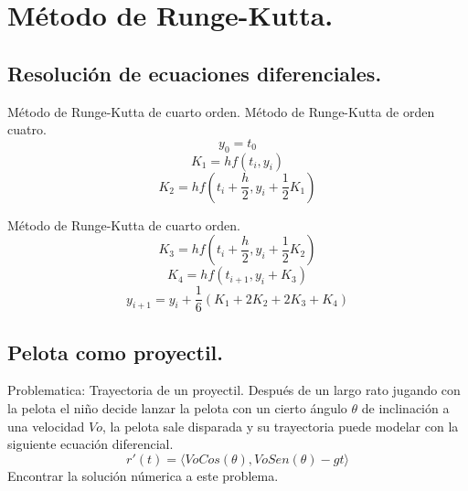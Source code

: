 \documentclass[12pt]{beamer}
\begin{document}
\section{Método de Runge-Kutta.}
\subsection{Resolución de ecuaciones diferenciales.}
\begin{frame}{Método de Runge-Kutta de cuarto orden.}
Método de Runge-Kutta de orden cuatro.
$$ y_{0} = t_{0} $$
$$ K_{1} = hf(t_{i}, y_{i})$$
$$ K_{2} = hf(t_{i} + \frac{h}{2}, y_{i} + \frac{1}{2} K_{1})$$
\end{frame}
\begin{frame}{Método de Runge-Kutta de cuarto orden.}
$$ K_{3} = hf(t_{i} + \frac{h}{2}, y_{i} + \frac{1}{2} K_{2})$$
$$ K_{4} = hf(t_{i+1}, y_{i} + K_{3})$$
$$ y_{i+1} = y_{i} + \frac{1}{6}(K_{1} + 2K_{2} + 2K_{3} + K_{4})$$
\end{frame}
\subsection{Pelota como proyectil.}
\begin{frame}{Problematica: Trayectoria de un proyectil.}
Después de un largo rato jugando con la pelota el niño decide lanzar la pelota con un cierto ángulo $\theta$ de inclinación a una velocidad $Vo$, la pelota sale disparada y su trayectoria puede modelar con la siguiente ecuación diferencial.
$$ r'(t) = \langle VoCos( \theta ), VoSen( \theta ) - gt \rangle $$
Encontrar la solución númerica a este problema.
\end{frame}
\end{document}
